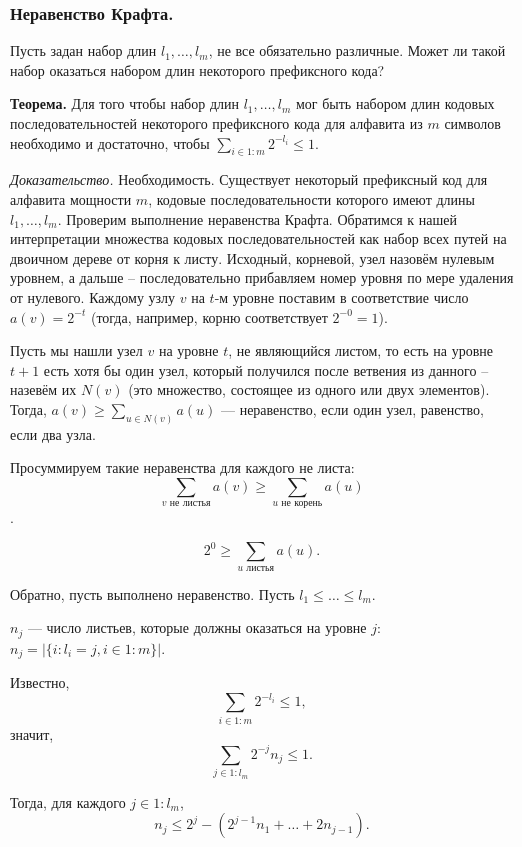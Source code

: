 \subsubsection{Неравенство Крафта.}

Пусть задан набор длин $l_{1}, \ldots, l_{m}$, не все обязательно различные. Может ли такой набор оказаться набором длин некоторого префиксного кода? 

\textbf{Теорема.} Для того чтобы набор длин $l_{1}, \ldots, l_{m}$ мог быть набором длин кодовых последовательностей некоторого префиксного кода для алфавита из $m$ символов необходимо и достаточно, чтобы $\sum\limits_{i\in 1:m} 2^{-l_{i}} \leqslant 1$.

\textit{Доказательство.} Необходимость. Существует некоторый префиксный код для алфавита мощности $m$, кодовые последовательности которого имеют длины $l_{1}, \ldots, l_{m}$. Проверим выполнение неравенства Крафта. Обратимся к нашей интерпретации множества кодовых последовательностей как набор всех путей на двоичном дереве от корня к листу. Исходный, корневой, узел назовём нулевым уровнем, а дальше -- последовательно прибавляем номер уровня по мере удаления от нулевого. Каждому узлу $v$ на $t$-м уровне поставим в соответствие число $a(v) = 2^{-t}$ (тогда, например, корню соответствует $2^{-0} = 1$). 

Пусть мы нашли узел $v$ на уровне $t$, не являющийся листом, то есть на уровне $t+1$ есть хотя бы один узел, который получился после ветвения из данного -- назевём их $N(v)$ (это множество, состоящее из одного или двух элементов). Тогда, $a(v) \geqslant \sum\limits_{u \in N(v)} a(u)$ --- неравенство, если один узел, равенство, если два узла.

Просуммируем такие неравенства для каждого не листа: $$\sum\limits_{v \text{ не листья}} a(v) \geqslant \sum\limits_{u \text{ не корень}} a(u)$$.

$$2^{0} \geqslant \sum\limits_{u \text{ листья}} a(u).$$

Обратно, пусть выполнено неравенство. Пусть $l_{1}\leqslant \ldots \leqslant l_{m}$.

$n_{j}$ --- число листьев, которые должны оказаться на уровне $j$: $n_{j} = |\{i: l_{i} = j, i\in 1:m\}|$.

Известно, $$\sum\limits_{i\in 1:m} 2^{-l_{i}} \leqslant 1,$$ значит, $$\sum\limits_{j\in 1:l_{m}} 2^{-{j}} n_{j} \leqslant 1.$$

Тогда, для каждого $j\in 1:l_{m}$, $$n_{j} \leqslant 2^{j} - (2^{j-1}n_{1} +\ldots + 2 n_{j-1}).$$

